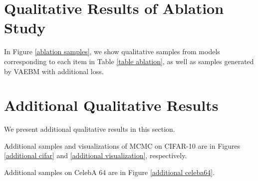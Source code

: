 \documentclass{article} \usepackage{iclr2021_conference,times}
\begin{document}
\section{Qualitative Results of Ablation Study} \label{ablation qualitative}

In Figure \ref{ablation samples}, we show qualitative samples from models corresponding to each item in Table \ref{table ablation}, as well as samples generated by VAEBM with additional  loss.


\section{Additional Qualitative Results}\label{additional qualitative}
We present additional qualitative results in this section.

Additional samples and visualizations of MCMC on CIFAR-10 are in Figures \ref{additional cifar} and \ref{additional visualization}, respectively. 

Additional samples on CelebA 64 are in Figure \ref{additional celeba64}.
\end{document}
